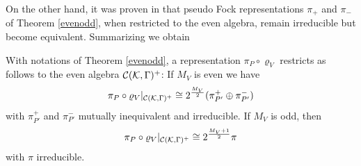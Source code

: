 \documentclass[10pt,a4paper]{article}
\begin{document}
On the other hand, it was proven in \cite{Decom} that
pseudo Fock representations $\pi_+$ and $\pi_-$ of
Theorem \ref{evenodd}, when restricted to the even
algebra, remain irreducible but become equivalent.
Summarizing we obtain
\begin{theorem}
\label{restodd}
With notations of Theorem \ref{evenodd}, a representation
$\pi_P\circ\varrho_V$ restricts as follows to the even
algebra ${\cal C}({\cal K},\Gamma)^+$: If $M_V$ is even
we have
\begin{equation}
\pi_P\circ\varrho_V|_{{\cal C}({\cal K},\Gamma)^+}
\cong 2^\frac{M_V}{2}(\pi_{P'}^+\oplus\pi_{P'}^-)
\end{equation}
with $\pi_{P'}^+$ and $\pi_{P'}^-$ mutually
inequivalent and irreducible. If $M_V$ is odd, then
\begin{equation}
\pi_P\circ\varrho_V|_{{\cal C}({\cal K},\Gamma)^+}
\cong 2^\frac{M_V+1}{2} \pi
\end{equation}
with $\pi$ irreducible.
\end{theorem}
\end{document}
